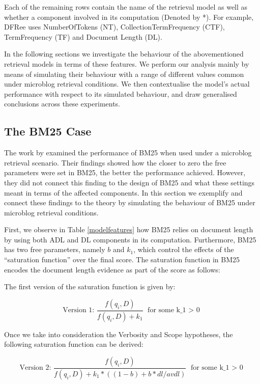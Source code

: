 Each of the remaining rows contain the name of the retrieval model as well as whether a component involved in its computation (Denoted by *). For example, DFRee uses NumberOfTokens (NT), CollectionTermFrequency (CTF), TermFrequency (TF) and Document Length (DL).

In the following sections we investigate the behaviour of the abovementioned retrieval models in terms of these features. We perform our analysis mainly by means of simulating their behaviour with a range of different values common under microblog retrieval conditions. We then contextualise the model's actual performance with respect to its simulated behaviour, and draw generalised conclusions across these experiments.

\subsection{The BM25 Case}
\label{bm25case}
The work by \cite{ferguson2012investigation} examined the performance of BM25 when used under a microblog retrieval scenario. Their findings showed how the closer to zero the free parameters were set in BM25, the better the performance achieved. However, they did not connect this finding to the design of BM25 and what these settings meant in terms of the affected components. In this section we exemplify and connect these findings to the theory by simulating the behaviour of BM25 under microblog retrieval conditions.

First, we observe in Table \ref{modelfeatures} how BM25 relies on document length by using both ADL and DL components in its computation. Furthermore, BM25 has two free parameters, namely \(b\) and \(k_1\), which control the effects of the ``saturation function'' over the final score. The saturation function in BM25 encodes the document length evidence as part of the score as follows: 

The first version of the saturation function is given by:

\begin{equation}
 \text{Version 1: }\frac{f(q_i, D)}{f(q_i, D) + k_1} \text{   for some k_1 $>$ 0}
\end{equation}

Once we take into consideration the Verbosity and Scope hypotheses, the following saturation function can be derived:

\begin{equation}
 \text{Version 2: }\frac{f(q_i, D)}{f(q_i, D) + k_1*((1-b)+b*dl/avdl)} \text{   for some k_1 $>$ 0}
\end{equation}

